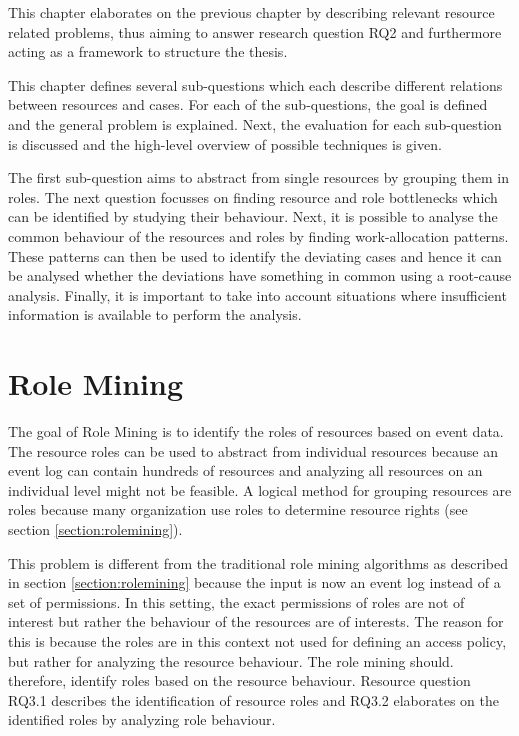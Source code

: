 This chapter elaborates on the previous chapter by describing relevant resource related problems, thus aiming to answer research question RQ2 and furthermore acting as a framework to structure the thesis. 

This chapter defines several sub-questions which each describe different relations between resources and cases. For each of the sub-questions, the goal is defined and the general problem is explained. Next, the evaluation for each sub-question is discussed and the high-level overview of possible techniques is given. 


The first sub-question aims to abstract from single resources by grouping them in roles. The next question focusses on finding resource and role bottlenecks which can be identified by studying their behaviour. Next, it is possible to analyse the common behaviour of the resources and roles by finding work-allocation patterns. These patterns can then be used to identify the deviating cases and hence it can be analysed whether the deviations have something in common using a root-cause analysis. Finally, it is important to take into account situations where insufficient information is available to perform the analysis.

\section{Role Mining}
The goal of Role Mining is to identify the roles of resources based on event data. The resource roles can be used to abstract from individual resources because an event log can contain hundreds of resources and analyzing all resources on an individual level might not be feasible. A logical method for grouping resources are roles because many organization use roles to determine resource rights (see section \ref{section:rolemining}). 

This problem is different from the traditional role mining algorithms as described in section \ref{section:rolemining} because the input is now an event log instead of a set of permissions. In this setting, the exact permissions of roles are not of interest but rather the behaviour of the resources are of interests. The reason for this is because the roles are in this context not used for defining an access policy, but rather for analyzing the resource behaviour. The role mining should. therefore, identify roles based on the resource behaviour. Resource question RQ3.1 describes the identification of resource roles and  RQ3.2 elaborates on the identified roles by analyzing role behaviour. 

